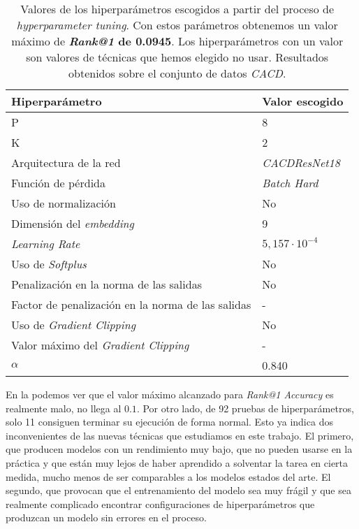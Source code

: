 \begin{table}[!hbtp]
\centering
\begin{tabular}{|l|l|}
    \hline
    \textbf{Hiperparámetro}                           & \textbf{Valor escogido} \\
    \hline
    P                                                 & 8                       \\
    K                                                 & 2                       \\
    Arquitectura de la red                            & \textit{CACDResNet18}   \\
    Función de pérdida                                & \textit{Batch Hard}     \\
    Uso de normalización                              & No                      \\
    Dimensión del \textit{embedding}                  & 9                       \\
    \textit{Learning Rate}                            & $5,157 \cdot 10^{-4}$   \\
    Uso de \textit{Softplus}                          & No                      \\
    Penalización en la norma de las salidas           & No                      \\
    Factor de penalización en la norma de las salidas & -                       \\
    Uso de \textit{Gradient Clipping}                 & No                      \\
    Valor máximo del \textit{Gradient Clipping}       & -                       \\
    $\alpha$                                          & 0.840                   \\

    \hline
\end{tabular}
\caption{Valores de los hiperparámetros escogidos a partir del proceso de \textit{hyperparameter tuning}. Con estos parámetros obtenemos un valor máximo de \textbf{\textit{Rank@1} de 0.0945}. Los hiperparámetros con un valor \entrecomillado{-} son valores de técnicas que hemos elegido no usar. Resultados obtenidos sobre el conjunto de datos \textit{CACD}.}
\label{table:hp_escogidos}
\end{table}

En la  podemos ver que el valor máximo alcanzado para \textit{Rank@1 Accuracy} es realmente malo, no llega al $0.1$. Por otro lado, de 92 pruebas de hiperparámetros, solo 11 consiguen terminar su ejecución de forma normal. Esto ya indica dos inconvenientes de las nuevas técnicas que estudiamos en este trabajo. El primero, que producen modelos con un rendimiento muy bajo, que no pueden usarse en la práctica y que están muy lejos de haber aprendido a solventar la tarea en cierta medida, mucho menos de ser comparables a los modelos estados del arte. El segundo, que provocan que el entrenamiento del modelo sea muy frágil y que sea realmente complicado encontrar configuraciones de hiperparámetros que produzcan un modelo sin errores en el proceso.

